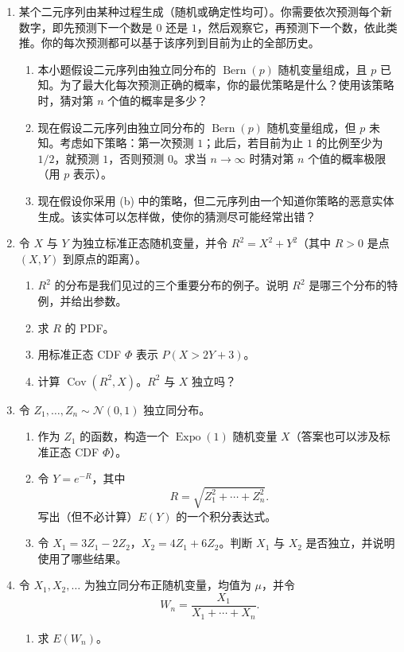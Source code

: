 \documentclass[UTF8, 12pt, fontset=fandol, oneside]{ctexart}
\begin{document}
\begin{enumerate}
  \item 某个二元序列由某种过程生成（随机或确定性均可）。你需要依次预测每个新数字，即先预测下一个数是 $0$ 还是 $1$，然后观察它，再预测下一个数，依此类推。你的每次预测都可以基于该序列到目前为止的全部历史。
  \begin{enumerate}
    \item 本小题假设二元序列由独立同分布的 $\operatorname{Bern}(p)$ 随机变量组成，且 $p$ 已知。为了最大化每次预测正确的概率，你的最优策略是什么？使用该策略时，猜对第 $n$ 个值的概率是多少？
    \item 现在假设二元序列由独立同分布的 $\operatorname{Bern}(p)$ 随机变量组成，但 $p$ 未知。考虑如下策略：第一次预测 $1$；此后，若目前为止 $1$ 的比例至少为 $1/2$，就预测 $1$，否则预测 $0$。求当 $n\to\infty$ 时猜对第 $n$ 个值的概率极限（用 $p$ 表示）。
    \item 现在假设你采用 (b) 中的策略，但二元序列由一个知道你策略的恶意实体生成。该实体可以怎样做，使你的猜测尽可能经常出错？
  \end{enumerate}

  \item 令 $X$ 与 $Y$ 为独立标准正态随机变量，并令 $R^2=X^2+Y^2$（其中 $R>0$ 是点 $(X,Y)$ 到原点的距离）。
  \begin{enumerate}
    \item $R^2$ 的分布是我们见过的三个重要分布的例子。说明 $R^2$ 是哪三个分布的特例，并给出参数。
    \item 求 $R$ 的 PDF。
    \item 用标准正态 CDF $\Phi$ 表示 $P(X>2Y+3)$。
    \item 计算 $\operatorname{Cov}(R^2,X)$。$R^2$ 与 $X$ 独立吗？
  \end{enumerate}

  \item 令 $Z_1,\ldots,Z_n\sim\mathcal N(0,1)$ 独立同分布。
  \begin{enumerate}
    \item 作为 $Z_1$ 的函数，构造一个 $\operatorname{Expo}(1)$ 随机变量 $X$（答案也可以涉及标准正态 CDF $\Phi$）。
    \item 令 $Y=e^{-R}$，其中
    \[
      R=\sqrt{Z_1^2+\cdots+Z_n^2}.
    \]
    写出（但不必计算）$E(Y)$ 的一个积分表达式。
    \item 令 $X_1=3Z_1-2Z_2$，$X_2=4Z_1+6Z_2$。判断 $X_1$ 与 $X_2$ 是否独立，并说明使用了哪些结果。
  \end{enumerate}

  \item 令 $X_1,X_2,\ldots$ 为独立同分布正随机变量，均值为 $\mu$，并令
  \[
    W_n=\frac{X_1}{X_1+\cdots+X_n}.
  \]
  \begin{enumerate}
    \item 求 $E(W_n)$。


\end{enumerate}
\end{enumerate}
\end{document}
